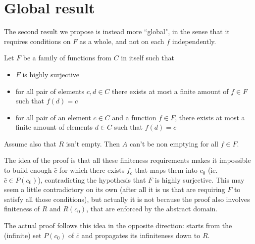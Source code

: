\section{Global result}
The second result we propose is instead more ``global", in the sense that it requires conditions on $F$ as a whole, and not on each $f$ independently.

\begin{theorem}\label{ch4:th:non-empt-res-global}
	Let $F$ be a family of functions from $C$ in itself such that
	\begin{itemize}
		\item $F$ is highly surjective
		\item for all pair of elements $c, d \in C$ there exists at most a finite amount of $f \in F$ such that $f(d) = c$
		\item for all pair of an element $c \in C$ and a function $f \in F$, there exists at most a finite amount of elements $d \in C$ such that $f(d) = c$
	\end{itemize}
	Assume also that $R$ isn't empty. Then $A$ can't be non emptying for all $f \in F$.
\end{theorem}

The idea of the proof is that all these finiteness requirements makes it impossible to build enough $\bar{c}$ for which there exists $f_{\bar{c}}$ that maps them into $c_0$ (ie. $\bar{c} \in P(c_0)$), contradicting the hypothesis that $F$ is highly surjective. This may seem a little contradictory on its own (after all it is us that are requiring $F$ to satisfy all those conditions), but actually it is not because the proof also involves finiteness of $R$ and $R(c_0)$, that are enforced by the abstract domain.

The actual proof follows this idea in the opposite direction: starts from the (infinite) set $P(c_0)$ of $\bar{c}$ and propagates its infiniteness down to $R$.

